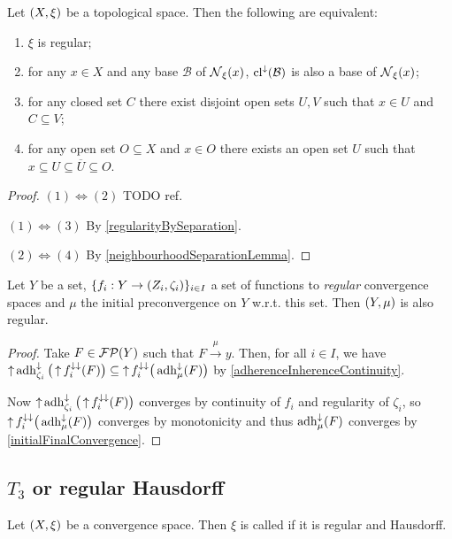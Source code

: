 \begin{proposition} \label{topologicalRegularity}
Let $\left( X,\xi \right)$ be a topological space. Then the following are equivalent:
\begin{enumerate}
\item $\xi$ is regular;
\item for any $x\in X$ and any base $\mathcal{B}$ of $\operatorname{\mathcal{N}}_\xi(x)$, $\operatorname{cl}^\downarrow(\mathcal{B})$ is also a base of $\operatorname{\mathcal{N}}_\xi(x)$;
\item for any closed set $C$ there exist disjoint open sets $U,V$ such that $x\in U$ and $C\subseteq V$;
\item for any open set $O\subseteq X$ and $x\in O$ there exists an open set $U$ such that $x\subseteq U\subseteq \overline{U} \subseteq O$.
\end{enumerate}
\end{proposition}
\begin{proof}
$(1) \Leftrightarrow (2)$ TODO ref.

$(1) \Leftrightarrow (3)$ By \ref{regularityBySeparation}.

$(2) \Leftrightarrow (4)$ By \ref{neighbourhoodSeparationLemma}.
\end{proof}

\begin{proposition} \label{regularityInitialConvergence}
Let $Y$ be a set, $\{f_i: Y\to \left( Z_i, \zeta_i \right)\}_{i\in I}$ a set of functions to \emph{regular} convergence spaces and $\mu$ the initial preconvergence on $Y$ w.r.t. this set. Then $\left( Y,\mu \right)$ is also regular.
\end{proposition}
\begin{proof}
Take $F\in \operatorname{\mathcal{FP}}(Y)$ such that $F\overset{\mu}{\longrightarrow} y$. Then, for all $i\in I$, we have $\operatorname{\uparrow}\operatorname{adh}_{\zeta_i}^\downarrow\big(\operatorname{\uparrow} f_i^{\downarrow\downarrow}(F)\big)\subseteq \operatorname{\uparrow} f_i^{\downarrow\downarrow}\big(\operatorname{adh}_{\mu}^{\downarrow}(F)\big)$ by \ref{adherenceInherenceContinuity}.

Now $\operatorname{\uparrow}\operatorname{adh}_{\zeta_i}^\downarrow\big(\operatorname{\uparrow} f_i^{\downarrow\downarrow}(F)\big)$ converges by continuity of $f_i$ and regularity of $\zeta_i$, so $\operatorname{\uparrow} f_i^{\downarrow\downarrow}\big(\operatorname{adh}_{\mu}^{\downarrow}(F)\big)$ converges by monotonicity and thus $\operatorname{adh}_{\mu}^{\downarrow}(F)$ converges by \ref{initialFinalConvergence}.
\end{proof}

\subsection{$T_3$ or regular Hausdorff}
\begin{definition}
Let $\left( X,\xi \right)$ be a convergence space. Then $\xi$ is called  if it is regular and Hausdorff.
\end{definition}

